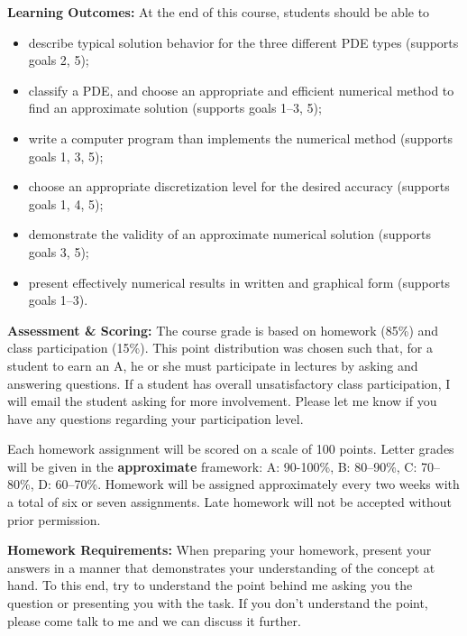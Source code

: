\documentclass{article}
\begin{document}
\textbf{Learning Outcomes:}
At the end of this course, students should be able to 

\vspace{-0.1in}
\begin{itemize}

\item describe typical solution behavior for the three different PDE types
(supports goals 2, 5);

\item classify a PDE, and choose an appropriate and efficient numerical method
to find an approximate solution (supports goals 1--3, 5);

\item write a computer program than implements the numerical method
(supports goals 1, 3, 5); 

\item choose an appropriate discretization level for the desired accuracy
(supports goals 1, 4, 5);

\item demonstrate the validity of an approximate numerical solution
(supports goals 3, 5);

\item present effectively numerical results in written and graphical form
(supports goals 1--3).

\end{itemize}

\clearpage 
\textbf{Assessment \& Scoring:} 
%
The course grade is based on homework (85\%) and class participation (15\%).
This point distribution was chosen such that, for a student to earn an A, he
or she must participate in lectures by asking and answering questions.    If
a student has overall unsatisfactory class participation, I will email the
student asking for more involvement.  Please let me know if
you have any questions regarding your participation level.

Each homework assignment will be scored on a scale of 100 points.  Letter
grades will be given in the \textbf{approximate} framework: A: 90-100\%, B:
80--90\%, C: 70--80\%, D: 60--70\%.  Homework will be assigned approximately
every two weeks with a total of six or seven assignments.  Late homework
will not be accepted without prior permission.  

\textbf{Homework Requirements:} 
%
When preparing your homework, present your answers in a manner that
demonstrates your understanding of the concept at hand.   To this end, try
to understand the point behind me asking you the question or presenting you
with the task.  If you don't understand the point, please come talk to me
and we can discuss it further.
\end{document}
